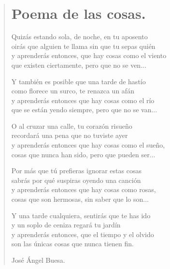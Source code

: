 \documentclass[11pt, portrait, twoside, notitlepage, openright]{book}
\begin{document}
\newpage
\begin{verse}
\begin{center}
\section{Poema de las cosas.}
\end{center}

Quizás estando sola, de noche, en tu aposento\\
oirás que alguien te llama sin que tu sepas quién\\
y aprenderás entonces, que hay cosas como el viento\\
que existen ciertamente, pero que no se ven...
\newline

Y también es posible que una tarde de hastío\\
como florece un surco, te renazca un afán\\
y aprenderás entonces que hay cosas como el río\\
que se están yendo siempre, pero que no se van...
\newline

O al cruzar una calle, tu corazón risueño\\
recordará una pena que no tuviste ayer\\
y aprenderás entonces que hay cosas como el sueño,\\
cosas que nunca han sido, pero que pueden ser...
\newline

Por más que tú prefieras ignorar estas cosas\\
sabrás por qué suspiras oyendo una canción\\
y aprenderás entonces que hay cosas como rosas,\\
cosas que son hermosas, sin saber que lo son...
\newpage

Y una tarde cualquiera, sentirás que te has ido\\
y un soplo de ceniza regará tu jardín\\
y aprenderás entonces, que el tiempo y el olvido\\
son las únicas cosas que nunca tienen fin.
\newline

José Ángel Buesa.
\end{verse}
\end{document}
